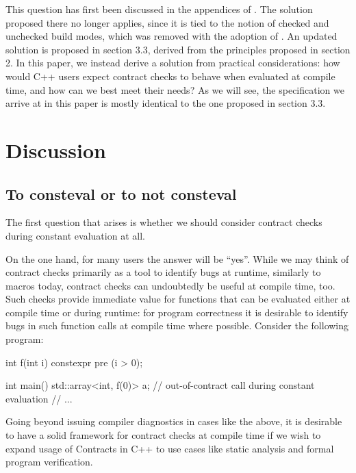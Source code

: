This question has first been discussed in the appendices of \cite{P2834R1}. The solution proposed there no longer applies, since it is tied to the notion of checked and unchecked build modes, which was removed with the adoption of \cite{P2877R0}. An updated solution is proposed in \cite{P2932R1} section 3.3, derived from the  principles proposed in \cite{P2932R1} section 2. In this paper, we instead derive a solution from practical considerations: how would C++ users expect contract checks to behave when evaluated at compile time, and how can we best meet their needs? As we will see, the specification we arrive at in this paper is mostly identical to the one proposed in \cite{P2932R1} section 3.3.  %


\section{Discussion}

\subsection{To consteval or to not consteval}

The first question that arises is whether we should consider contract checks during constant evaluation at all.

On the one hand, for many users the answer will be ``yes''. While we may think of contract checks primarily as a tool to identify bugs at runtime, similarly to  macros today, contract checks can undoubtedly be useful at compile time, too. Such checks provide immediate value for  functions that can be evaluated either at compile time or during runtime: for program correctness it is desirable to identify bugs in such function calls at compile time where possible. Consider the following program:

\begin{codeblock}
int f(int i) constexpr 
  pre (i > 0);

int main() {
  std::array<int, f(0)> a;  // out-of-contract call during constant evaluation
  // ...
}
\end{codeblock}

Going beyond issuing compiler diagnostics in cases like the above, it is desirable to have a solid framework for contract checks at compile time if we wish to expand usage of Contracts in C++ to use cases like static analysis and formal program verification. 

